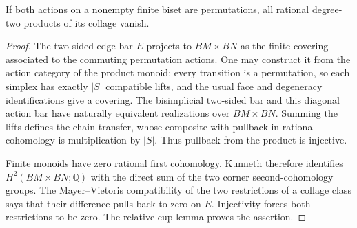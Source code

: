 \begin{lemma}
\label{CP2:A-permutation-biset}
If both actions on a nonempty finite biset are permutations,
all rational degree-two products of its collage vanish.
\end{lemma}
\begin{proof}
The two-sided edge bar $E$ projects to $BM\times BN$ as the
finite covering associated to the commuting permutation
actions. One may construct it from the action category of
the product monoid: every transition is a permutation, so
each simplex has exactly $|S|$ compatible lifts, and the
usual face and degeneracy identifications give a covering.
The bisimplicial two-sided bar and this diagonal action bar
have naturally equivalent realizations over $BM\times BN$.
Summing the lifts defines the chain transfer, whose composite
with pullback in rational cohomology is multiplication by
$|S|$. Thus pullback from the product is injective.

Finite monoids have zero rational first cohomology. Kunneth
therefore identifies $H^2(BM\times BN;\mathbb Q)$ with the
direct sum of the two corner second-cohomology groups.
The Mayer--Vietoris compatibility of the two restrictions
of a collage class says that their difference pulls back
to zero on $E$. Injectivity forces both restrictions to
be zero. The relative-cup lemma proves the assertion.
\end{proof}

